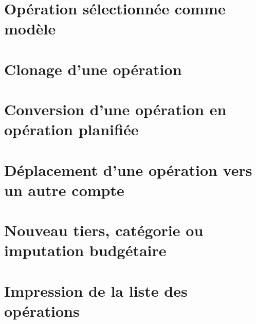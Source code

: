 \section{Opération sélectionnée comme modèle\label{transactions-model}}


\section{Clonage d'une opération\label{transactions-duplicate}}


\section{Conversion d'une opération en opération planifiée\label{transactions-schedule}}


\section{Déplacement d'une opération vers un autre compte\label{transactions-move}}


\section{Nouveau tiers, catégorie ou imputation budgétaire\label{transactions-fillcombo}}


\section{Impression de la liste des opérations\label{transactions-print}}


